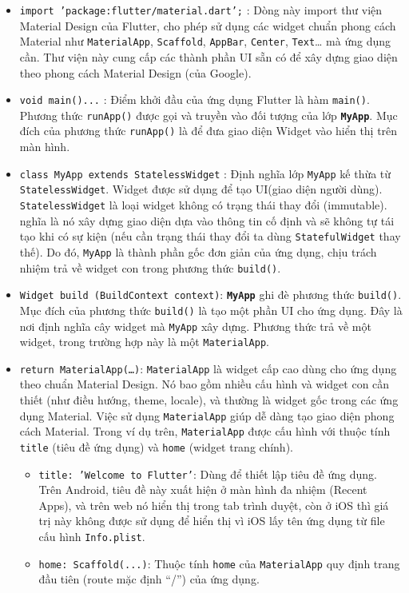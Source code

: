 \documentclass[../DoAn.tex]{subfiles}
\numberwithin{figure}{chapter}
\begin{document}
\begin{itemize}
\item \texttt{import 'package:flutter/material.dart';} : Dòng này import thư viện Material Design của Flutter, cho phép sử dụng các widget chuẩn phong cách Material như \texttt{MaterialApp}, \texttt{Scaffold}, \texttt{AppBar}, \texttt{Center}, \texttt{Text}… mà ứng dụng cần. Thư viện này cung cấp các thành phần UI sẵn có để xây dựng giao diện theo phong cách Material Design (của Google).
\item \texttt{void main(){...}} : Điểm khởi đầu của ứng dụng Flutter là hàm \texttt{main()}. Phương thức \texttt{runApp()} được gọi và truyền vào đối tượng của lớp \textbf{\texttt{MyApp}}. Mục đích của phương thức \texttt{runApp()} là để đưa giao diện Widget vào hiển thị trên màn hình.
\item \texttt{class MyApp extends StatelessWidget} : Định nghĩa lớp \texttt{MyApp} kế thừa từ \texttt{StatelessWidget}. Widget được sử dụng để tạo UI(giao diện người dùng). \texttt{StatelessWidget} là loại widget không có trạng thái thay đổi (immutable). nghĩa là nó xây dựng giao diện dựa vào thông tin cố định và sẽ không tự tái tạo khi có sự kiện (nếu cần trạng thái thay đổi ta dùng \texttt{StatefulWidget} thay thế). Do đó, \texttt{MyApp} là thành phần gốc đơn giản của ứng dụng, chịu trách nhiệm trả về widget con trong phương thức \texttt{build()}.
\item \texttt{Widget build (BuildContext context)}: \textbf{\texttt{MyApp}} ghi đè phương thức \texttt{build()}. Mục đích của phương thức \texttt{build()} là tạo một phần UI cho ứng dụng. Đây là nơi định nghĩa cây widget mà \texttt{MyApp} xây dựng. Phương thức trả về một widget, trong trường hợp này là một \texttt{MaterialApp}.
\item \texttt{return MaterialApp(\ldots)}: \texttt{MaterialApp} là widget cấp cao dùng cho ứng dụng theo chuẩn Material Design. Nó bao gồm nhiều cấu hình và widget con cần thiết (như điều hướng, theme, locale), và thường là widget gốc trong các ứng dụng Material. Việc sử dụng \texttt{MaterialApp} giúp dễ dàng tạo giao diện phong cách Material. Trong ví dụ trên, \texttt{MaterialApp} được cấu hình với thuộc tính \texttt{title} (tiêu đề ứng dụng) và \texttt{home} (widget trang chính).  
\begin{itemize} 
\item \texttt{title: 'Welcome to Flutter'}: Dùng để thiết lập tiêu đề ứng dụng. Trên Android, tiêu đề này xuất hiện ở màn hình đa nhiệm (Recent Apps), và trên web nó hiển thị trong tab trình duyệt, còn ở iOS thì giá trị này không được sử dụng để hiển thị vì iOS lấy tên ứng dụng từ file cấu hình \texttt{Info.plist}.
\item \texttt{home: Scaffold(...)}: Thuộc tính \texttt{home} của \texttt{MaterialApp} quy định trang đầu tiên (route mặc định “/”) của ứng dụng.
\end{itemize}


\end{itemize}
\end{document}
